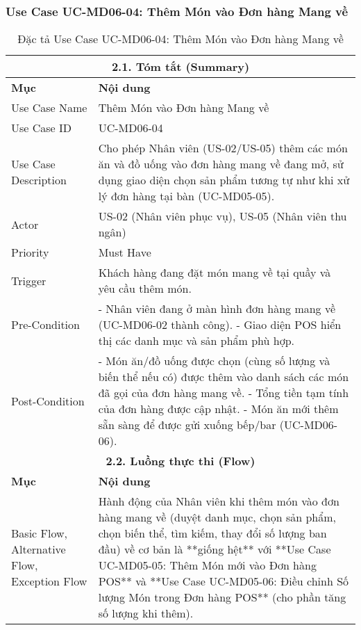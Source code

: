 \subsubsection{Use Case UC-MD06-04: Thêm Món vào Đơn hàng Mang về}
\begin{longtable}{|m{4cm}|p{11cm}|}
\caption{Đặc tả Use Case UC-MD06-04: Thêm Món vào Đơn hàng Mang về} \label{tab:uc_md06_04_final_v3} \\
\hline
\multicolumn{2}{|c|}{\textbf{2.1. Tóm tắt (Summary)}} \\
\hline
\textbf{Mục} & \textbf{Nội dung} \\
\hline
\endhead %
\hline
\endfoot %
\hline
\endlastfoot %
Use Case Name & Thêm Món vào Đơn hàng Mang về \\
\hline
Use Case ID & UC-MD06-04 \\
\hline
Use Case Description & Cho phép Nhân viên (US-02/US-05) thêm các món ăn và đồ uống vào đơn hàng mang về đang mở, sử dụng giao diện chọn sản phẩm tương tự như khi xử lý đơn hàng tại bàn (UC-MD05-05). \\
\hline
Actor & US-02 (Nhân viên phục vụ), US-05 (Nhân viên thu ngân) \\
\hline
Priority & Must Have \\
\hline
Trigger & Khách hàng đang đặt món mang về tại quầy và yêu cầu thêm món. \\
\hline
Pre-Condition & - Nhân viên đang ở màn hình đơn hàng mang về (UC-MD06-02 thành công). \newline - Giao diện POS hiển thị các danh mục và sản phẩm phù hợp. \\
\hline
Post-Condition & - Món ăn/đồ uống được chọn (cùng số lượng và biến thể nếu có) được thêm vào danh sách các món đã gọi của đơn hàng mang về. \newline - Tổng tiền tạm tính của đơn hàng được cập nhật. \newline - Món ăn mới thêm sẵn sàng để được gửi xuống bếp/bar (UC-MD06-06). \\
\hline
\multicolumn{2}{|c|}{\textbf{2.2. Luồng thực thi (Flow)}} \\
\hline
\textbf{Mục} & \textbf{Nội dung} \\
\hline
Basic Flow, Alternative Flow, Exception Flow & Hành động của Nhân viên khi thêm món vào đơn hàng mang về (duyệt danh mục, chọn sản phẩm, chọn biến thể, tìm kiếm, thay đổi số lượng ban đầu) về cơ bản là **giống hệt** với **Use Case UC-MD05-05: Thêm Món mới vào Đơn hàng POS** và **Use Case UC-MD05-06: Điều chỉnh Số lượng Món trong Đơn hàng POS** (cho phần tăng số lượng khi thêm). \\

\end{longtable}

